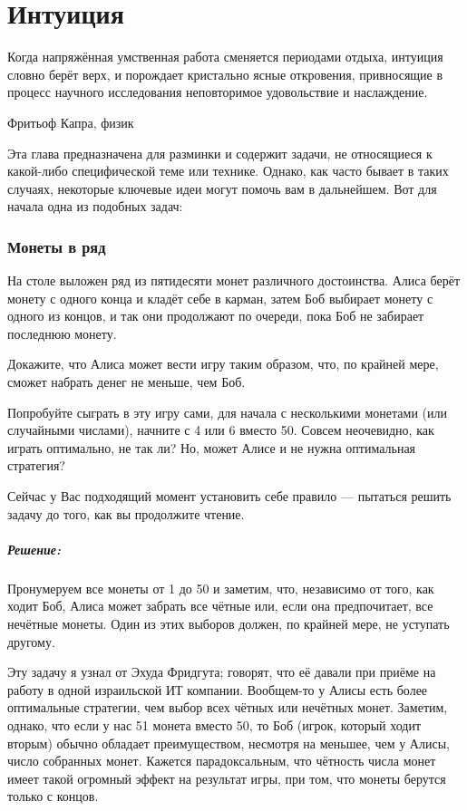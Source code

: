 \chapter*{Интуиция}
 

\epigraph{Когда напряжённая умственная работа сменяется периодами отдыха, интуиция словно берёт верх, и порождает кристально ясные откровения, привносящие в процесс научного исследования неповторимое удовольствие и наслаждение.}{Фритьоф Капра, физик}

Эта глава предназначена для разминки и содержит задачи, не относящиеся к какой-либо специфической теме или технике.
Однако, как часто бывает в таких случаях, некоторые ключевые идеи могут помочь вам в дальнейшем.
 Вот для начала одна из подобных задач:

\subsection*{Монеты в ряд} %

На столе выложен ряд из пятидесяти монет различного достоинства.
Алиса берёт монету с одного конца и кладёт себе в карман, затем Боб выбирает монету с одного из концов, и так они продолжают по очереди, пока Боб не забирает последнюю монету.

Докажите, что Алиса может вести игру таким образом, что, по крайней мере, сможет набрать денег не меньше, чем Боб.

\medskip

Попробуйте сыграть в эту игру сами, для начала с несколькими монетами (или случайными числами), начните с 4 или 6 вместо 50.
Совсем неочевидно, как играть оптимально, не так ли?
Но, может Алисе и не нужна оптимальная стратегия? 

Сейчас у Вас подходящий момент установить себе правило --- пытаться решить задачу до того, как вы продолжите чтение.

\paragraph{Решение:}
Пронумеруем все монеты от 1 до 50 и заметим, что, независимо от того, как ходит Боб, Алиса может забрать все чётные или, если она предпочитает, все нечётные монеты.
Один из этих выборов должен, по крайней мере, не уступать другому.
\heart

Эту задачу я узнал от Эхуда Фридгута;
говорят, что её давали при приёме на работу в одной израильской ИТ компании.
Вообщем-то у Алисы есть более оптимальные стратегии, чем выбор всех чётных или нечётных монет.
Заметим, однако, что если у нас 51 монета вместо 50, то Боб (игрок, который ходит вторым) обычно обладает преимуществом, несмотря на меньшее, чем у Алисы, число собранных монет.
Кажется парадоксальным, что чётность числа монет имеет такой огромный эффект на результат игры, при том, что монеты берутся только с концов.

